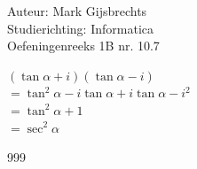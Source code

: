 \documentclass[a4paper]{article}
\begin{document}
\noindent \large Auteur: Mark Gijsbrechts \\
\noindent \large Studierichting: Informatica\\
\noindent \large Oefeningenreeks 1B nr. 10.7\\

\medskip

\normalsize

$\left(\tan \alpha + i \right) \left(\tan \alpha - i \right)$ \\

$= \tan^2 \alpha - i \tan \alpha + i \tan \alpha -i^2$ \\

$= \tan^2 \alpha + 1$ \\

$= \sec^2 \alpha$



\begin{thebibliography}{999}
\end{thebibliography}
\end{document}
